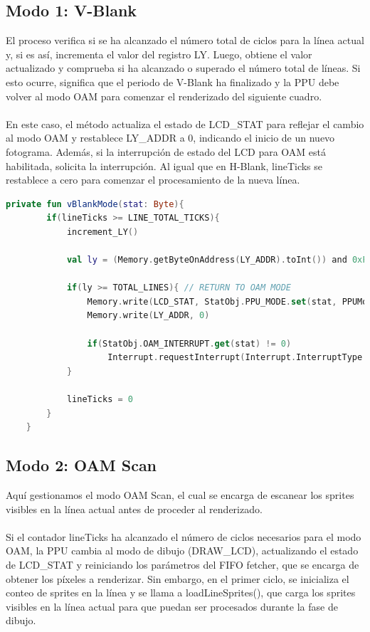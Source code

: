 \subsection{Modo 1: V-Blank}

El proceso verifica si se ha alcanzado el número total de ciclos para la línea actual y, si es así, incrementa el valor del registro LY. Luego, obtiene el valor actualizado y comprueba si ha alcanzado o superado el número total de líneas. Si esto ocurre, significa que el periodo de V-Blank ha finalizado y la PPU debe volver al modo OAM para comenzar el renderizado del siguiente cuadro.
\\\\
En este caso, el método actualiza el estado de LCD\_STAT para reflejar el cambio al modo OAM y restablece LY\_ADDR a 0, indicando el inicio de un nuevo fotograma. Además, si la interrupción de estado del LCD para OAM está habilitada, solicita la interrupción. Al igual que en H-Blank, lineTicks se restablece a cero para comenzar el procesamiento de la nueva línea.

\begin{lstlisting}[language=Kotlin, caption={Lógica del proceso de V-Blank.}, label={code:ppuvblank}]
    private fun vBlankMode(stat: Byte){
        if(lineTicks >= LINE_TOTAL_TICKS){
            increment_LY()

            val ly = (Memory.getByteOnAddress(LY_ADDR).toInt()) and 0xFF

            if(ly >= TOTAL_LINES){ // RETURN TO OAM MODE
                Memory.write(LCD_STAT, StatObj.PPU_MODE.set(stat, PPUMode.OAM.number))
                Memory.write(LY_ADDR, 0)

                if(StatObj.OAM_INTERRUPT.get(stat) != 0)
                    Interrupt.requestInterrupt(Interrupt.InterruptType.LCD_STAT.getByteMask()) // ASK FOR LCD STAT INTERRUPT IF LCD_STAT HAS THE OAM BIT ACTIVATED
            }

            lineTicks = 0
        }
    }
\end{lstlisting}

\subsection{Modo 2: OAM Scan}

Aquí gestionamos el modo OAM Scan, el cual se encarga de escanear los sprites visibles en la línea actual antes de proceder al renderizado.
\\\\
Si el contador lineTicks ha alcanzado el número de ciclos necesarios para el modo OAM, la PPU cambia al modo de dibujo (DRAW\_LCD), actualizando el estado de LCD\_STAT y reiniciando los parámetros del FIFO fetcher, que se encarga de obtener los píxeles a renderizar. Sin embargo, en el primer ciclo, se inicializa el conteo de sprites en la línea y se llama a loadLineSprites(), que carga los sprites visibles en la línea actual para que puedan ser procesados durante la fase de dibujo.


